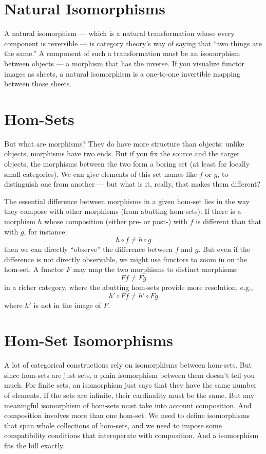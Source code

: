 \section{Natural Isomorphisms}

A natural isomorphism --- which is a natural transformation whose every
component is reversible --- is category theory's way of saying that
``two things are the same.'' A component of such a transformation must
be an isomorphism between objects --- a morphism that has the inverse.
If you visualize functor images as sheets, a natural isomorphism is a
one-to-one invertible mapping between those sheets.

\section{Hom-Sets}

But what are morphisms? They do have more structure than objects: unlike
objects, morphisms have two ends. But if you fix the source and the
target objects, the morphisms between the two form a boring set (at
least for locally small categories). We can give elements of this set
names like $f$ or $g$, to distinguish one from another ---
but what is it, really, that makes them different?

The essential difference between morphisms in a given hom-set lies in
the way they compose with other morphisms (from abutting hom-sets). If
there is a morphism $h$ whose composition (either pre- or post-)
with $f$ is different than that with $g$, for instance:
\[h \circ f \neq h \circ g\]
then we can directly ``observe'' the difference between $f$ and
$g$. But even if the difference is not directly observable, we
might use functors to zoom in on the hom-set. A functor $F$ may
map the two morphisms to distinct morphisms:
\[F f \neq F g\]
in a richer category, where the abutting hom-sets provide more
resolution, e.g.,
\[h' \circ F f \neq h' \circ F g\]
where $h'$ is not in the image of $F$.

\section{Hom-Set Isomorphisms}

A lot of categorical constructions rely on isomorphisms between
hom-sets. But since hom-sets are just sets, a plain isomorphism between
them doesn't tell you much. For finite sets, an isomorphism just says
that they have the same number of elements. If the sets are infinite,
their cardinality must be the same. But any meaningful isomorphism of
hom-sets must take into account composition. And composition involves
more than one hom-set. We need to define isomorphisms that span whole
collections of hom-sets, and we need to impose some compatibility
conditions that interoperate with composition. And a 
isomorphism fits the bill exactly.


